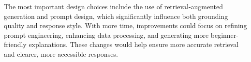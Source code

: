 \documentclass[10pt,conference]{IEEEtran}
\begin{document}
The most important design choices include the use of retrieval-augmented generation and prompt design, which significantly influence both grounding quality and response style. With more time, improvements could focus on refining prompt engineering, enhancing data processing, and generating more beginner-friendly explanations. These changes would help ensure more accurate retrieval and clearer, more accessible responses.







\end{document}
